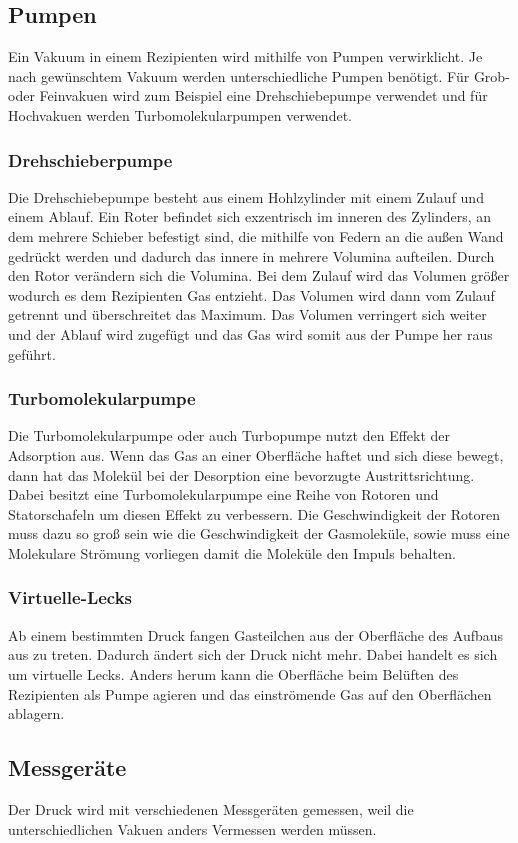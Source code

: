 \subsection{Pumpen}
Ein Vakuum in einem Rezipienten wird mithilfe von Pumpen verwirklicht. Je nach gewünschtem Vakuum werden unterschiedliche Pumpen benötigt. Für Grob- oder Feinvakuen wird zum Beispiel eine Drehschiebepumpe verwendet und für Hochvakuen werden Turbomolekularpumpen verwendet.
\subsubsection{Drehschieberpumpe}
Die Drehschiebepumpe besteht aus einem Hohlzylinder mit einem Zulauf und einem Ablauf. Ein Roter befindet sich exzentrisch im inneren des Zylinders, an dem mehrere Schieber befestigt sind, die mithilfe von Federn an die außen Wand gedrückt werden und dadurch das innere in mehrere Volumina aufteilen. Durch den Rotor verändern sich die Volumina. Bei dem Zulauf wird das Volumen größer wodurch es dem Rezipienten Gas entzieht. Das Volumen wird dann vom Zulauf getrennt und überschreitet das Maximum. Das Volumen verringert sich weiter und der Ablauf wird zugefügt und das Gas wird somit aus der Pumpe her raus geführt.

\subsubsection{Turbomolekularpumpe}
Die Turbomolekularpumpe oder auch Turbopumpe nutzt den Effekt der Adsorption aus. Wenn das Gas an einer Oberfläche haftet und sich diese bewegt, dann hat das Molekül bei der Desorption eine bevorzugte Austrittsrichtung. Dabei besitzt eine Turbomolekularpumpe eine Reihe von Rotoren und Statorschafeln um diesen Effekt zu verbessern. Die Geschwindigkeit der Rotoren muss dazu so groß sein wie die Geschwindigkeit der Gasmoleküle, sowie muss eine Molekulare Strömung vorliegen damit die Moleküle den Impuls behalten.
\subsubsection{Virtuelle-Lecks}
Ab einem bestimmten Druck fangen Gasteilchen aus der Oberfläche des Aufbaus aus zu treten. Dadurch ändert sich der Druck nicht mehr. Dabei handelt es sich um virtuelle Lecks. Anders herum kann die Oberfläche beim Belüften des Rezipienten als Pumpe agieren und das einströmende Gas auf den Oberflächen ablagern.
\subsection{Messgeräte}
Der Druck wird mit verschiedenen Messgeräten gemessen, weil die unterschiedlichen Vakuen anders Vermessen werden müssen.

